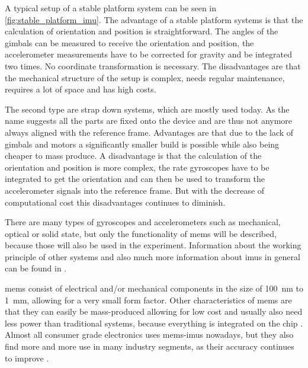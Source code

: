 A typical setup of a stable platform system can be seen in \cref{fig:stable_platform_imu}.
The advantage of a stable platform systems is that the calculation of orientation and position is straightforward.
The angles of the gimbals can be measured to receive the orientation and position, the accelerometer measurements have to be corrected for gravity and be integrated two times.
No coordinate transformation is necessary.
The disadvantages are that the mechanical structure of the setup is complex, needs regular maintenance, requires a lot of space and has high costs.\par
The second type are strap down systems, which are mostly used today.
As the name suggests all the parts are fixed onto the device and are thus not anymore always aligned with the reference frame.
Advantages are that due to the lack of gimbals and motors a significantly smaller build is possible while also being cheaper to mass produce.
A disadvantage is that the calculation of the orientation and position is more complex, the rate gyroscopes have to be integrated to get the orientation and can then be used to transform the accelerometer signals into the reference frame.
But with the decrease of computational cost this disadvantages continues to diminish.\par
There are many types of gyroscopes and accelerometers such as mechanical, optical or solid state, but only the functionality of \gls{mems} will be described, because those will also be used in the experiment.
Information about the working principle of other systems and also much more information about \glspl{imu} in general can be found in \cite{Woodman2007}.\par
\gls{mems} consist of electrical and/or mechanical components in the size of \SI{100}{\nano\metre} to \SI{1}{\milli\metre}, allowing for a very small form factor.
Other characteristics of \gls{mems} are that they can easily be mass-produced allowing for low cost and usually also need less power than traditional systems, because everything is integrated on the chip \cite{Shaeffer2013}.
Almost all consumer grade electronics uses \gls{mems}-\glspl{imu} nowadays, but they also find more and more use in many industry segments, as their accuracy continues to improve \cite{Perlmutter2016}.

